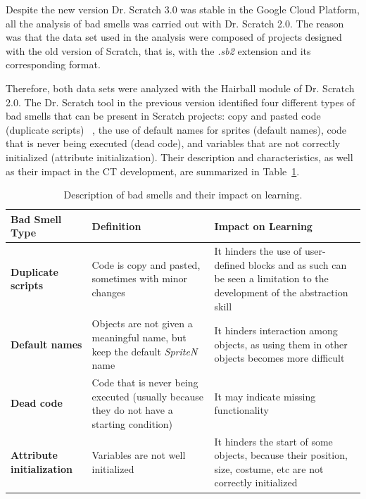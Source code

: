 Despite the new version Dr. Scratch 3.0 was stable in the Google Cloud Platform, all the analysis of bad smells was carried out with Dr. Scratch 2.0. The reason was that the data set used in the analysis were composed of projects designed with the old version of Scratch, that is, with the \textit{.sb2} extension  and its corresponding format.

Therefore, both data sets were analyzed with the Hairball module of Dr. Scratch 2.0. The Dr. Scratch tool in the previous version identified four different types of bad smells that can be present in Scratch projects: copy and pasted code (duplicate scripts) ~\cite{robles2017software}, the use of default names for sprites (default names), code that is never being executed (dead code), and variables that are not correctly initialized (attribute initialization). Their description and characteristics, as well as their impact in the CT development, are summarized in Table~\ref{table:bad_smells}.

\begin{table}
 \begin{center}
  \begin{tabular}{|p{4cm}|p{5cm}|p{5cm}|}
    \hline
    \textbf{Bad Smell Type} & \textbf{Definition} & \textbf{Impact on Learning} \\ \hline
    \textbf{Duplicate scripts} & Code is copy and pasted, sometimes with minor changes & It hinders the use of user-defined blocks and as such can be seen a limitation to the development of the abstraction skill \\ \hline
    \textbf{Default names} & Objects are not given a meaningful name, but keep the default {\em SpriteN} name & It hinders interaction among objects, as using them in other objects becomes more difficult \\ \hline
    \textbf{Dead code} & Code that is never being executed (usually because they do not have a starting condition) & It may indicate missing functionality \\ \hline
    \textbf{Attribute initialization} & Variables are not well initialized & It hinders the start of some objects, because their position, size, costume, etc are not correctly initialized \\ \hline
  \end{tabular}
  \caption{Description of bad smells and their impact on learning.}
  \label{table:bad_smells}
 \end{center}
\end{table}

